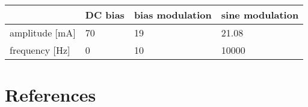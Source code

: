 \documentclass[\home/main.tex]{subfiles}
\begin{document}
\begin{refsection}
\lipsum[1-4]
      
      \begin{table}
        \centering
        \begin{tabular}{C{2cm}|C{1cm}C{1.3cm}C{1.3cm}}
                & \acrshort{DC} bias & bias modulation & sine modulation \\
          \hline
          amplitude [\si{\milli\ampere}] & \num{70} & \num{19} & \num{21.08} \\
          frequency [\si{\hertz}] & \num{0} & \num{10} & \num{10000}
        \end{tabular}
        \label{ext_abstr:drive_signals}
      \end{table}
  
  \lipsum[20-23]

    \section{References}

      \printbibliography[heading=none]


\end{refsection}

\end{document}
